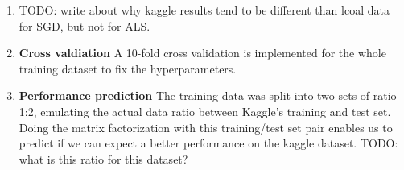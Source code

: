 \begin{enumerate}
  \item TODO: write about why kaggle results tend to be different than lcoal data for
    SGD, but not for ALS.
  \item \textbf{Cross valdiation} A 10-fold cross validation is implemented
    for the whole training dataset to fix the hyperparameters. 

  \item \textbf{Performance prediction} The training data was split into two
    sets of ratio 1:2, emulating the actual data ratio between Kaggle's training
    and test set. Doing the matrix factorization with this training/test set
    pair enables us to predict if we can expect a better performance on the
    kaggle dataset.  
    TODO: what is this ratio for this dataset? 
\end{enumerate}

